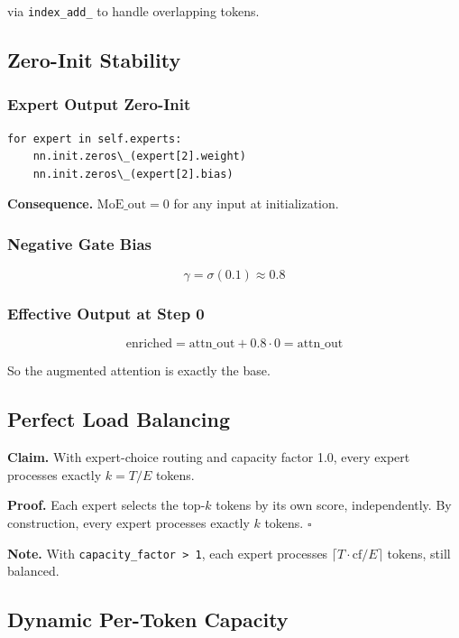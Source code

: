 via \texttt{index\_add\_} to handle overlapping tokens.

\subsection{Zero-Init Stability}

\subsubsection{Expert Output Zero-Init}

\begin{lstlisting}
for expert in self.experts:
    nn.init.zeros\_(expert[2].weight)
    nn.init.zeros\_(expert[2].bias)
\end{lstlisting}

\textbf{Consequence.} $\text{MoE\_out} = 0$ for any input at initialization.

\subsubsection{Negative Gate Bias}

\[
\gamma = \sigma(0.1) \approx 0.8
\tag{4.13}
\]

\subsubsection{Effective Output at Step 0}

\[
\text{enriched} = \text{attn\_out} + 0.8 \cdot 0 = \text{attn\_out}
\tag{4.14}
\]

So the augmented attention is exactly the base.

\subsection{Perfect Load Balancing}

\textbf{Claim.} With expert-choice routing and capacity factor 1.0, every expert 
processes exactly $k = T / E$ tokens.

\textbf{Proof.} Each expert selects the top-$k$ tokens by its own score, 
independently. By construction, every expert processes exactly $k$ tokens. 
$\square$

\textbf{Note.} With \texttt{capacity\_factor \textgreater{} 1}, each expert processes $\lceil T \cdot 
\text{cf} / E \rceil$ tokens, still balanced.

\subsection{Dynamic Per-Token Capacity}

